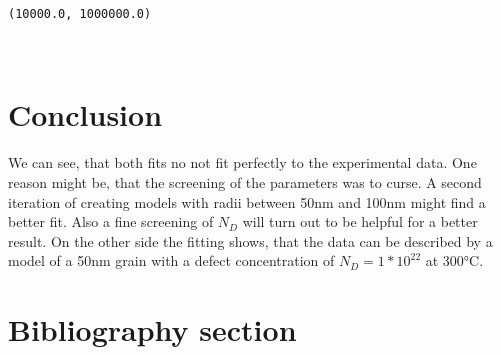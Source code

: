 \documentclass[11pt]{article}
\makeatletter
\newcommand{\boxspacing}{\kern\kvtcb@left@rule\kern\kvtcb@boxsep}
\newcommand{\prompt}[4]{
        \ttfamily\llap{{\color{#2}[#3]:\hspace{3pt}#4}}\vspace{-\baselineskip}
    }
\makeatother
\begin{document}
            \begin{tcolorbox}[breakable, size=fbox, boxrule=.5pt, pad at break*=1mm, opacityfill=0]
\prompt{Out}{outcolor}{360}{\boxspacing}
\begin{Verbatim}[commandchars=\\\{\}]
(10000.0, 1000000.0)
\end{Verbatim}
\end{tcolorbox}
        
    \begin{center}
    \end{center}
    { \hspace*{\fill} \\}
    
    \hypertarget{conclusion}{%
\section{Conclusion}\label{conclusion}}

We can see, that both fits no not fit perfectly to the experimental
data. One reason might be, that the screening of the parameters was to
curse. A second iteration of creating models with radii between 50nm and
100nm might find a better fit. Also a fine screening of \(N_D\) will
turn out to be helpful for a better result. On the other side the
fitting shows, that the data can be described by a model of a 50nm grain
with a defect concentration of \(N_D=1*10^{22}\) at 300°C.

    \hypertarget{bibliography-section}{%
\section{Bibliography section}\label{bibliography-section}}

    



    
    
    
\end{document}
